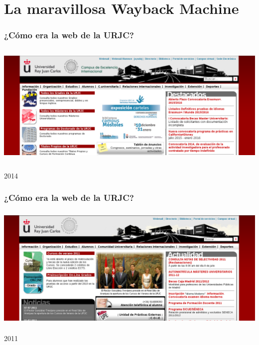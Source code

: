 %
%

\section{La maravillosa Wayback Machine}

\begin{frame}
\frametitle{¿Cómo era la web de la URJC?}

\includegraphics[height=6cm]{figs/web-urjc-2014}

{\Large
\begin{flushright}
2014
\end{flushright}
}
\end{frame}

\begin{frame}
\frametitle{¿Cómo era la web de la URJC?}

\includegraphics[height=6cm]{figs/web-urjc-2011}

{\Large
\begin{flushright}
2011
\end{flushright}
}
\end{frame}

